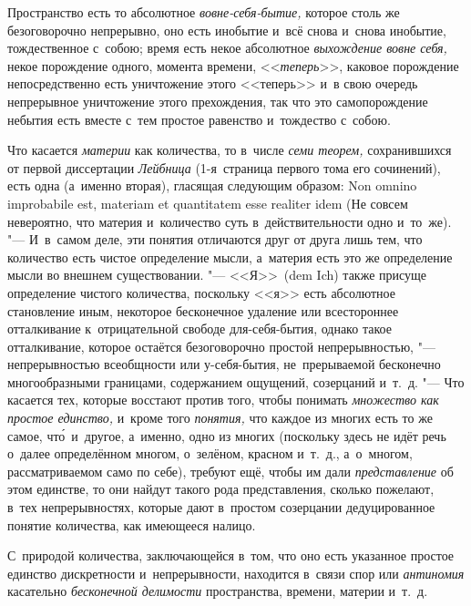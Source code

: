 Пространство есть то абсолютное {\em вовне-себя-бытие,} которое столь же
безоговорочно непрерывно, оно есть инобытие и~всё снова и~снова инобытие,
тождественное с~собою; время есть некое абсолютное {\em выхождение вовне себя,}
некое порождение одного, момента времени, <<{\em теперь}>>, каковое порождение
непосредственно есть уничтожение этого <<теперь>> и~в свою очередь непрерывное
уничтожение этого прехождения, так что это самопорождение небытия есть вместе
с~тем простое равенство и~тождество с~собою.

Что касается {\em материи} как количества, то в~числе {\em семи теорем,}
сохранившихся от первой диссертации {\em Лейбница} (1-я~страница первого тома его сочинений), есть одна
(а~именно вторая), гласящая следующим образом: Non omnino impro\-babi\-le est,
mate\-riam et quanti\-tatem esse reali\-ter idem (Не совсем невероятно, что
материя и~количество суть в~действительности одно и~то~же). "--- И~в~самом
деле, эти понятия отличаются друг от друга лишь тем, что количество есть
чистое определение мысли, а~материя есть это же определение мысли во внешнем
существовании. "--- <<Я>>~(dem Ich) также присуще определение чистого
количества, поскольку <<я>> есть абсолютное становление иным, некоторое
бесконечное удаление или всестороннее отталкивание к~отрицательной свободе
для-себя-бытия, однако такое отталкивание, которое остаётся безоговорочно
простой непрерывностью, "--- непрерывностью всеобщности или у-себя-бытия,
не~прерываемой бесконечно многообразными границами, содержанием ощущений,
созерцаний и~т.~д. "--- Что касается тех, которые восстают против того, чтобы
понимать {\em множество как простое единство,} и~кроме того {\em понятия,} что
каждое из многих есть то же самое, чт\'{о}~и~другое, а~именно, одно из многих
(поскольку здесь не идёт речь о~далее определённом многом, о~зелёном, красном
и~т.~д., а~о~многом, рассматриваемом само по себе), требуют ещё, чтобы им дали
{\em представление} об этом единстве, то они найдут такого рода представления,
сколько пожелают, в~тех непрерывностях, которые дают в~простом созерцании
дедуцированное понятие количества, как имеющееся налицо.


\label{bkm:bm88a}С~природой количества, заключающейся в~том, что оно есть
указанное простое единство дискретности и~непрерывности, находится в~связи спор
или {\em антиномия} касательно {\em бесконечной делимости} пространства,
времени, материи и~т.~д.

